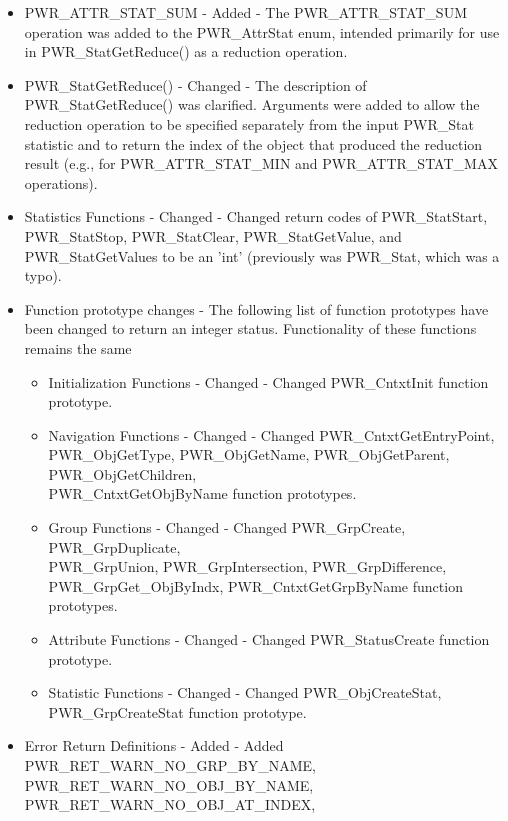 \begin{itemize}
    \item{PWR_ATTR_STAT_SUM - Added - The PWR_ATTR_STAT_SUM operation was added to the PWR_AttrStat enum, intended primarily for use in PWR_StatGetReduce() as a reduction operation. }
    \item{PWR_StatGetReduce() - Changed - The description of PWR_StatGetReduce() was clarified. Arguments were added to allow the reduction operation to be specified separately from the input PWR_Stat statistic and to return the index of the object that produced the reduction result (e.g., for PWR_ATTR_STAT_MIN and PWR_ATTR_STAT_MAX operations).}
    \item{Statistics Functions - Changed - Changed return codes of PWR_StatStart, PWR_StatStop, PWR_StatClear, PWR_StatGetValue, and PWR_StatGetValues to be an 'int' (previously was PWR_Stat, which was a typo). }
    \item{Function prototype changes - The following list of function prototypes have been changed to return an integer status. Functionality of these functions remains the same}
    \begin{itemize}
      \item{Initialization Functions - Changed - Changed PWR_CntxtInit function prototype. }
      \item{Navigation Functions - Changed - Changed PWR_CntxtGetEntryPoint,\\
      PWR_ObjGetType, PWR_ObjGetName, PWR_ObjGetParent, PWR_ObjGetChildren,\\ 
      PWR_CntxtGetObjByName function prototypes. }
      \item{Group Functions - Changed - Changed PWR_GrpCreate, PWR_GrpDuplicate,\\
      PWR_GrpUnion, PWR_GrpIntersection, PWR_GrpDifference, \\
      PWR_GrpGet_ObjByIndx, PWR_CntxtGetGrpByName function prototypes. }
      \item{Attribute Functions - Changed - Changed PWR_StatusCreate function prototype. }
      \item{Statistic Functions - Changed - Changed PWR_ObjCreateStat, PWR_GrpCreateStat function prototype. }
    \end{itemize}
    \item{Error Return Definitions - Added - Added PWR_RET_WARN_NO_GRP_BY_NAME,\\
    PWR_RET_WARN_NO_OBJ_BY_NAME, PWR_RET_WARN_NO_OBJ_AT_INDEX, \\
}
\end{itemize}
